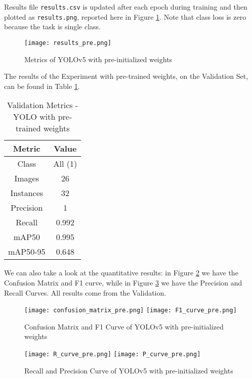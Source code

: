 Results file \texttt{results.csv} is updated after each epoch during training and then plotted as \texttt{results.png}, reported here in Figure \ref{fig:resultspre}. Note that class loss is zero because the task is single class.


\begin{figure}[h!]
  \centering
  \texttt{[image: results\_pre.png]}
  \caption{Metrics of YOLOv5 with pre-initialized weights}
  \label{fig:resultspre}
\end{figure}

The results of the Experiment with pre-trained weights, on the Validation Set, can be found in Table \ref{tab:table2}.

\begin{table}[h!]
    \centering
    \begin{tabular}{c|c}
    Metric & Value\\
    \hline
    Class & All (1)\\
    Images & 26 \\
    Instances & 32\\
    Precision & 1 \\  
    Recall & 0.992 \\
    mAP50 & 0.995\\
    mAP50-95 & 0.648\\
    \end{tabular}
    \caption{Validation Metrics - YOLO with pre-trained weights}
    \label{tab:table2}
\end{table}	

We can also take a look at the quantitative results: in Figure \ref{fig:Cmatrixyolopre} we have the Confusion Matrix and F1 curve, while in Figure \ref{fig:RPCurveyolopre} we have the Precision and Recall Curves. All results come from the Validation.

\begin{figure}[h!]
  \centering
  \texttt{[image: confusion\_matrix\_pre.png]}
  \texttt{[image: F1\_curve\_pre.png]}
  \caption{Confusion Matrix and F1 Curve of YOLOv5 with pre-initialized weights}
  \label{fig:Cmatrixyolopre}
\end{figure}


\begin{figure}[h!]
  \centering
  \texttt{[image: R\_curve\_pre.png]}
  \texttt{[image: P\_curve\_pre.png]}
  \caption{Recall and Precision Curve of YOLOv5 with pre-initialized weights}
  \label{fig:RPCurveyolopre}
\end{figure}

